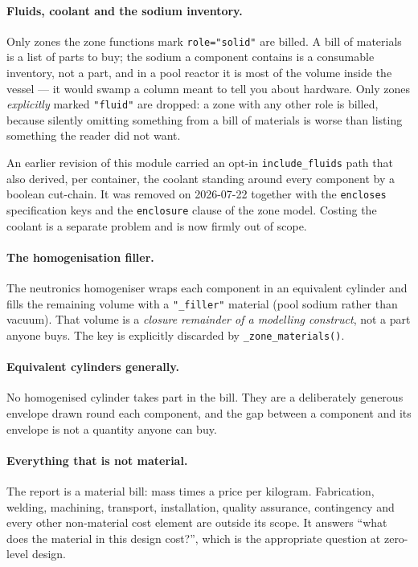 \documentclass[9pt,a4paper]{extarticle}
\newcommand{\code}[1]{\texttt{\small #1}}
\begin{document}
\paragraph{Fluids, coolant and the sodium inventory.} Only zones the zone
functions mark \code{role="solid"} are billed. A bill of materials is a list of
parts to buy; the sodium a component contains is a consumable inventory, not a
part, and in a pool reactor it is most of the volume inside the vessel --- it
would swamp a column meant to tell you about hardware. Only zones
\emph{explicitly} marked \code{"fluid"} are dropped: a zone with any other role
is billed, because silently omitting something from a bill of materials is worse
than listing something the reader did not want.

An earlier revision of this module carried an opt-in \code{include\_fluids} path
that also derived, per container, the coolant standing around every component by
a boolean cut-chain. It was removed on 2026-07-22 together with the
\code{encloses} specification keys and the \code{enclosure} clause of the zone
model. Costing the coolant is a separate problem and is now firmly out of scope.

\paragraph{The homogenisation filler.} The neutronics homogeniser wraps each
component in an equivalent cylinder and fills the remaining volume with a
\code{"\_filler"} material (pool sodium rather than vacuum). That volume is a
\emph{closure remainder of a modelling construct}, not a part anyone buys. The
key is explicitly discarded by \code{\_zone\_materials()}.

\paragraph{Equivalent cylinders generally.} No homogenised cylinder takes part
in the bill. They are a deliberately generous envelope drawn round each
component, and the gap between a component and its envelope is not a quantity
anyone can buy.

\paragraph{Everything that is not material.} The report is a material bill:
mass times a price per kilogram. Fabrication, welding, machining, transport,
installation, quality assurance, contingency and every other non-material cost
element are outside its scope. It answers ``what does the material in this
design cost?'', which is the appropriate question at zero-level design.
\end{document}
